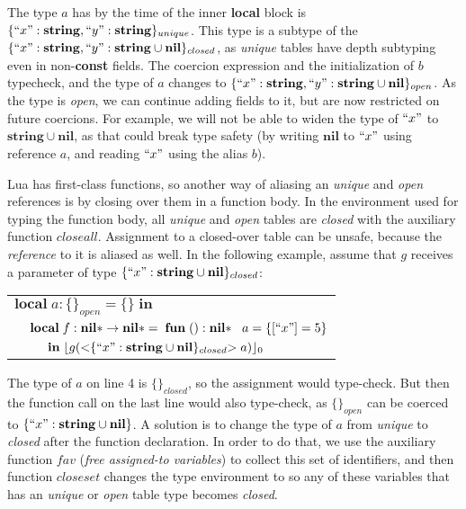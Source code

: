 \documentclass[10pt]{sigplanconf}
\newcommand{\Nil}{\mathbf{nil}}
\newcommand{\String}{\mathbf{string}}
\newcommand{\Void}{\Nil{*}}
\begin{document}
The type $a$ has by the time of the inner {\bf local} block
is $\{``x":\String, ``y":\String\}_{unique}$. This type is
a subtype of the $\{``x":\String, ``y":\String\cup\Nil\}_{closed}$, as {\em unique} tables
have depth subtyping even in non-{\bf const} fields.
The coercion expression and the initialization of $b$
typecheck, and the type of $a$ changes to
$\{``x":\String, ``y":\String\cup\Nil\}_{open}$.
As the type is {\em open}, we can continue adding fields
to it, but are now restricted on future coercions. For
example, we will not be able to widen the type of $``x"$
to $\String \cup \Nil$, as that could break type safety
(by writing $\Nil$ to $``x"$ using reference $a$, and reading
$``x"$ using the alias $b$).

Lua has first-class functions, so another way of aliasing
an {\em unique} and {\em open} references is by closing
over them in a function body. In the environment used for
typing the function body, all {\em unique} and {\em open}
tables are {\em closed} with the auxiliary function $closeall$.
Assignment to a closed-over table can be unsafe, because the {\em reference} to it is aliased as well. In the following
example, assume that $g$ receives a parameter of type
$\{ ``x": \String \cup \Nil\}_{closed}$:
{\footnotesize
\begin{center}
	\begin{tabular}{llll}
		\multicolumn{4}{l}{$\mathbf{local} \; a:\{\}_{open}
			= \{\} \; \mathbf{in}$}\\
		& \multicolumn{3}{l}{$\mathbf{local} \; f:\Void \rightarrow \Void =\;\mathbf{fun} \; ():\Void\;\;\;
		 a = \{[``x"]=5\} $}\\
		& & \multicolumn{2}{l}{$\mathbf{in} \; \lfloor g({<}\{``x":
			 \String \cup \Nil\}_{closed}{>} \; a) \rfloor_{0}$}
	\end{tabular}
\end{center}
}

The type of $a$ on line 4 is $\{\}_{closed}$, so the assignment
would type-check. But then the function call on the last line
would also type-check, as $\{\}_{open}$ can be coerced to
$\{ ``x": \String \cup \Nil\}$. A solution is to change the
type of $a$ from {\em unique} to {\em closed} after the function
declaration. In order to do that, we use the auxiliary function
$fav$ ({\em free assigned-to variables}) to collect this
set of identifiers, and then function $closeset$ changes
the type environment to so any of these variables that
has an {\em unique} or {\em open} table type becomes {\em closed}.
\end{document}
